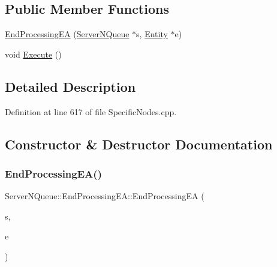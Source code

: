 \subsection*{Public Member Functions}
\begin{DoxyCompactItemize}
\item 
\hyperlink{class_server_n_queue_1_1_end_processing_e_a_aa8fbe9861955c9893ab1341d65093c02}{End\+Processing\+EA} (\hyperlink{class_server_n_queue}{Server\+N\+Queue} $\ast$s, \hyperlink{class_entity}{Entity} $\ast$e)
\item 
void \hyperlink{class_server_n_queue_1_1_end_processing_e_a_a58033da71d12b3d61bf4c48f7c470e3d}{Execute} ()
\end{DoxyCompactItemize}


\subsection{Detailed Description}


Definition at line 617 of file Specific\+Nodes.\+cpp.



\subsection{Constructor \& Destructor Documentation}
\mbox{\label{class_server_n_queue_1_1_end_processing_e_a_aa8fbe9861955c9893ab1341d65093c02}} 
\subsubsection{\texorpdfstring{End\+Processing\+E\+A()}{EndProcessingEA()}}
{\footnotesize\ttfamily Server\+N\+Queue\+::\+End\+Processing\+E\+A\+::\+End\+Processing\+EA (\begin{DoxyParamCaption}\item[{\hyperlink{class_server_n_queue}{Server\+N\+Queue} $\ast$}]{s,  }\item[{\hyperlink{class_entity}{Entity} $\ast$}]{e }\end{DoxyParamCaption})\hspace{0.3cm}{\ttfamily [inline]}}



